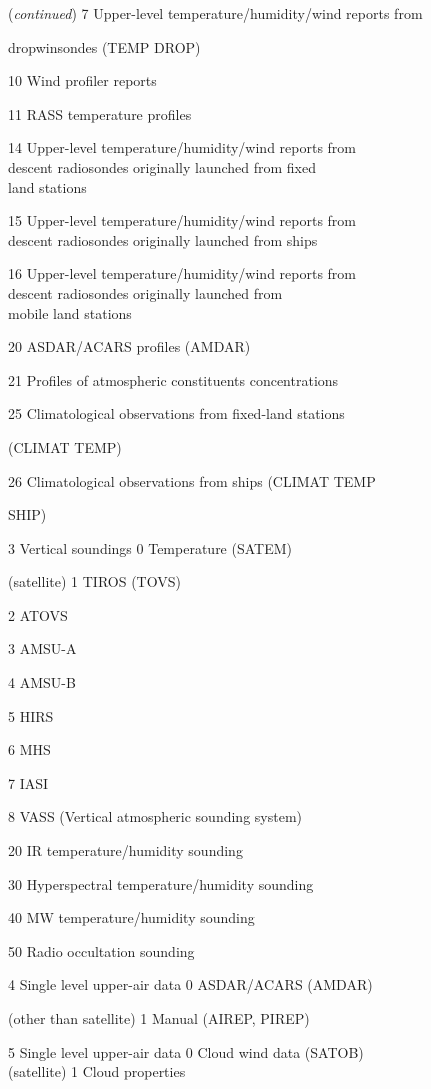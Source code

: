 (\emph{continued}) 7 Upper-level temperature/humidity/wind reports from

dropwinsondes (TEMP DROP)

10 Wind profiler reports

11 RASS temperature profiles

14 Upper-level temperature/humidity/wind reports from\\
descent radiosondes originally launched from fixed\\
land stations

15 Upper-level temperature/humidity/wind reports from\\
descent radiosondes originally launched from ships

16 Upper-level temperature/humidity/wind reports from\\
descent radiosondes originally launched from\\
mobile land stations

20 ASDAR/ACARS profiles (AMDAR)

21 Profiles of atmospheric constituents concentrations

25 Climatological observations from fixed-land stations

(CLIMAT TEMP)

26 Climatological observations from ships (CLIMAT TEMP

SHIP)

3 Vertical soundings 0 Temperature (SATEM)

(satellite) 1 TIROS (TOVS)

2 ATOVS

3 AMSU-A

4 AMSU-B

5 HIRS

6 MHS

7 IASI

8 VASS (Vertical atmospheric sounding system)

20 IR temperature/humidity sounding

30 Hyperspectral temperature/humidity sounding

40 MW temperature/humidity sounding

50 Radio occultation sounding

4 Single level upper-air data 0 ASDAR/ACARS (AMDAR)

(other than satellite) 1 Manual (AIREP, PIREP)

5 Single level upper-air data 0 Cloud wind data (SATOB)\\
(satellite) 1 Cloud properties

